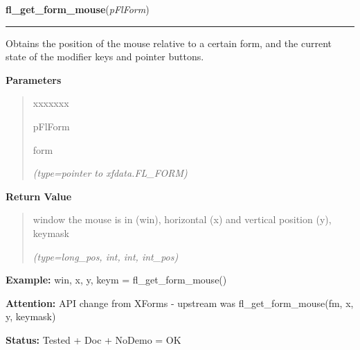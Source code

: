     \vspace{0.5ex}

\hspace{.8\funcindent}\begin{boxedminipage}{\funcwidth}

    \raggedright \textbf{fl\_get\_form\_mouse}(\textit{pFlForm})

    \vspace{-1.5ex}

    \rule{\textwidth}{0.5\fboxrule}
\setlength{\parskip}{2ex}
    Obtains the position of the mouse relative to a certain form, and the 
    current state of the modifier keys and pointer buttons.

\setlength{\parskip}{1ex}
      \textbf{Parameters}
      \vspace{-1ex}

      \begin{quote}
        \begin{Ventry}{xxxxxxx}

          \item[pFlForm]

          form

            {\it (type=pointer to xfdata.FL\_FORM)}

        \end{Ventry}

      \end{quote}

      \textbf{Return Value}
    \vspace{-1ex}

      \begin{quote}
      window the mouse is in (win), horizontal (x) and vertical position 
      (y), keymask

      {\it (type=long\_pos, int, int, int\_pos)}

      \end{quote}

\textbf{Example:} win, x, y, keym = fl\_get\_form\_mouse()



\textbf{Attention:} API change from XForms - upstream was fl\_get\_form\_mouse(fm, x, y, 
keymask)



\textbf{Status:} Tested + Doc + NoDemo = OK



    \end{boxedminipage}

    \label{xformslib:flxbasic:fl_win_to_form}


